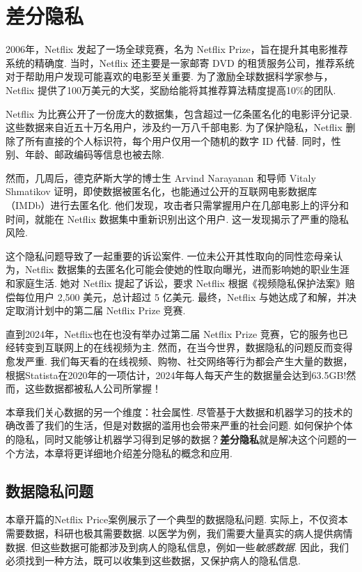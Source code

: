 \chapter{差分隐私}\label{chap:differential-privacy}

2006年，Netflix 发起了一场全球竞赛，名为 Netflix Prize，旨在提升其电影推荐系统的精确度. 当时，Netflix 还主要是一家邮寄 DVD 的租赁服务公司，推荐系统对于帮助用户发现可能喜欢的电影至关重要. 为了激励全球数据科学家参与，Netflix 提供了100万美元的大奖，奖励给能将其推荐算法精度提高10\%的团队. 

Netflix 为比赛公开了一份庞大的数据集，包含超过一亿条匿名化的电影评分记录. 这些数据来自近五十万名用户，涉及约一万八千部电影. 为了保护隐私，Netflix 删除了所有直接的个人标识符，每个用户仅用一个随机的数字 ID 代替. 同时，性别、年龄、邮政编码等信息也被去除. 

然而，几周后，德克萨斯大学的博士生 Arvind Narayanan 和导师 Vitaly Shmatikov 证明，即使数据被匿名化，也能通过公开的互联网电影数据库（IMDb）进行去匿名化. 他们发现，攻击者只需掌握用户在几部电影上的评分和时间，就能在 Netflix 数据集中重新识别出这个用户. 这一发现揭示了严重的隐私风险. 

这个隐私问题导致了一起重要的诉讼案件. 一位未公开其性取向的同性恋母亲认为，Netflix 数据集的去匿名化可能会使她的性取向曝光，进而影响她的职业生涯和家庭生活. 她对 Netflix 提起了诉讼，要求 Netflix 根据《视频隐私保护法案》赔偿每位用户 2,500 美元，总计超过 5 亿美元. 最终，Netflix 与她达成了和解，并决定取消计划中的第二届 Netflix Prize 竞赛. 

直到2024年，Netflix也在也没有举办过第二届 Netflix Prize 竞赛，它的服务也已经转变到互联网上的在线视频为主. 然而，在当今世界，数据隐私的问题反而变得愈发严重. 我们每天看的在线视频、购物、社交网络等行为都会产生大量的数据，根据Statista在2020年的一项估计，2024年每人每天产生的数据量会达到63.5GB!然而，这些数据都被私人公司所掌握！

本章我们关心数据的另一个维度：社会属性. 尽管基于大数据和机器学习的技术的确改善了我们的生活，但是对数据的滥用也会带来严重的社会问题. 如何保护个体的隐私，同时又能够让机器学习得到足够的数据？\textbf{差分隐私}就是解决这个问题的一个方法，本章将更详细地介绍差分隐私的概念和应用. 

\section{数据隐私问题}

本章开篇的Netflix Price案例展示了一个典型的数据隐私问题. 实际上，不仅资本需要数据，科研也极其需要数据. 以医学为例，我们需要大量真实的病人提供病情数据. 但这些数据可能都涉及到病人的隐私信息，例如一些\textit{敏感数据}. 因此，我们必须找到一种方法，既可以收集到这些数据，又保护病人的隐私信息.


